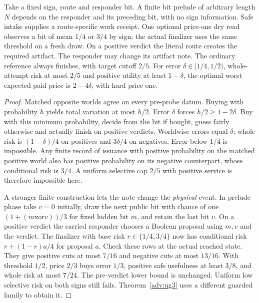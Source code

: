 \begin{proposition}\label{flag:u4}
Take a fixed sign, route and responder bit. A finite bit prelude of arbitrary length \(N\) depends on the responder and its preceding bit, with no sign information. Safe intake supplies a route-specific work receipt. One optional price-one dry read observes a bit of mean \(1/4\) or \(3/4\) by sign; the actual finalizer uses the same threshold on a fresh draw. On a positive verdict the literal route creates the required artifact. The responder may change its artifact note. The ordinary reference always finishes, with target cutoff \(2/5\). For error \(\delta\in[1/4,1/2)\), whole-attempt risk at most \(2/5\) and positive utility at least \(1-\delta\), the optimal worst expected paid price is \(2-4\delta\), with hard price one.
\end{proposition}
\begin{proof}
Matched opposite worlds agree on every pre-probe datum. Buying with probability \(h\) yields total variation at most \(h/2\). Error \(\delta\) forces \(h/2\ge1-2\delta\). Buy with this minimum probability, decide from the bit if bought, guess fairly otherwise and actually finish on positive verdicts. Worldwise errors equal \(\delta\); whole risk is \( (1-\delta)/4\) on positives and \(3\delta/4\) on negatives. Error below \(1/4\) is impossible. Any finite record of issuance with positive probability on the matched positive world also has positive probability on its negative counterpart, whose conditional risk is \(3/4\). A uniform selective cap \(2/5\) with positive service is therefore impossible here.

A stronger finite construction lets the note change the \emph{physical} event. In prelude phase take \(v=0\) initially, draw the next public bit with chance of one \((1+(m\mathbin{\mathrm{xor}} v))/3\) for fixed hidden bit \(m\), and retain the last bit \(v\). On a positive verdict the carried responder chooses a Boolean proposal using \(m,v\) and the verdict. The finalizer with base risk \(r\in\{1/4,3/4\}\) now has conditional risk \(r+(1-r)a/4\) for proposal \(a\). Check these rows at the actual reached state. They give positive cuts at most \(7/16\) and negative cuts at most \(13/16\). With threshold \(1/2\), price \(2/3\) buys error \(1/3\), positive safe usefulness at least \(3/8\), and whole risk at most \(7/24\). The pre-verdict lower bound is unchanged. Uniform low selective risk on both signs still fails. Theorem~\ref{adv:ug3} uses a different guarded family to obtain it.
\end{proof}

